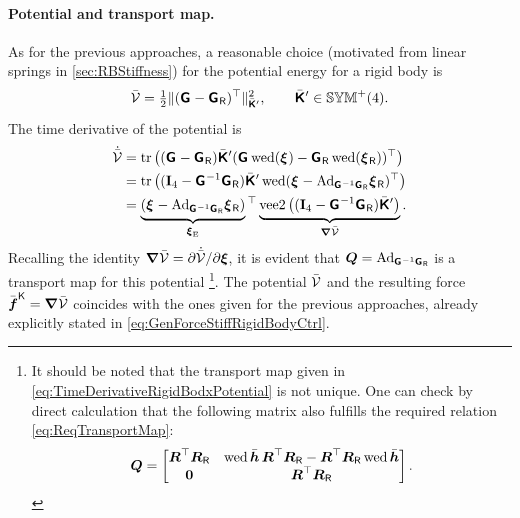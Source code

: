 \paragraph{Potential and transport map.}
As for the previous approaches, a reasonable choice (motivated from linear springs in \autoref{sec:RBStiffness}) for the potential energy for a rigid body is
\begin{align}\label{eq:PotentialRigidBodyAppOne}
 \potentialEnergyC = \tfrac{1}{2} \norm[\bodyStiffMatCp{}{}]{ (\bodyHomoCoord{}{} - \bodyHomoCoordR{}{} )^\top}^2,
\qquad
 \bodyStiffMatCp{}{} \in \SymMatP(4).
\end{align}
The time derivative of the potential is
\begin{align}\label{eq:TimeDerivativeRigidBodxPotential}
 \dot{\potentialEnergyC} &= \tr \big( (\bodyHomoCoord{}{} - \bodyHomoCoordR{}{}) \bodyStiffMatCp{}{} (\bodyHomoCoord{}{} \wedOp(\bodyVel{}{}) - \bodyHomoCoordR{}{} \wedOp(\bodyVelR{}{}))^\top \big)
 \nonumber\\
 &= \tr \big( (\idMat[4] - \bodyHomoCoord{}{}^{-1}\bodyHomoCoordR{}{}) \bodyStiffMatCp{}{} \wedOp(\bodyVel{}{} - \Ad{\bodyHomoCoord{}{}^{-1}\bodyHomoCoordR{}{}} \bodyVelR{}{})^\top \big)
\nonumber\\
 &= \underbrace{(\bodyVel{}{} - \Ad{\bodyHomoCoord{}{}^{-1}\bodyHomoCoordR{}{}} \bodyVelR{}{})}_{\sysVelE}\vphantom{|}^\top \underbrace{\veeTwoOp\big( (\idMat[4] - \bodyHomoCoord{}{}^{-1}\bodyHomoCoordR{}{}) \bodyStiffMatCp{}{} \big)}_{\differential \potentialEnergyC}.
\end{align}
Recalling the identity $\differential \potentialEnergyC = \spdiff[\dot{\potentialEnergyC}]{\sysVel}$, it is evident that $\sysTransportMap = \Ad{\bodyHomoCoord{}{}^{-1}\bodyHomoCoordR{}{}}$ is a transport map for this potential%
\footnote{
It should be noted that the transport map given in \eqref{eq:TimeDerivativeRigidBodxPotential} is not unique.
One can check by direct calculation that the following matrix also fulfills the required relation \eqref{eq:ReqTransportMap}:
\begin{align}\label{eq:RigidBodyAlternativeTransportMap}
 \sysTransportMap = \begin{bmatrix} \R^\top\RR & \wedOp\hc\,\R^\top\RR - \R^\top\RR \wedOp\hc \\ \mat{0} & \R^\top\RR \end{bmatrix}.
\end{align}
}.
The potential $\potentialEnergyC$ and the resulting force $\genForceStiffC = \differential \potentialEnergyC $ coincides with the ones given for the previous approaches, already explicitly stated in \eqref{eq:GenForceStiffRigidBodyCtrl}.

